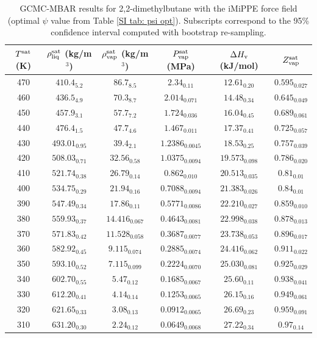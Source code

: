 \documentclass[journal=jctc,manuscript=article]{achemso}
\begin{document}
\begin{table}[htb!]
	\caption{GCMC-MBAR results for 2,2-dimethylbutane with the iMiPPE force field (optimal $\psi$ value from Table \ref{SI tab: psi opt}). Subscripts correspond to the 95\% confidence interval computed with bootstrap re-sampling.}
	\begin{center}
		\begin{tabular}{|c|c|c|c|c|c|}
			\hline
			$T^{\rm sat}$ (K) & $\rho_{\rm liq}^{\rm sat}$ (kg/m$^3$) & $\rho_{\rm vap}^{\rm sat}$ (kg/m$^3$) & $P_{\rm vap}^{\rm sat}$ (MPa) & $\Delta H_{\rm v}$ (kJ/mol) & $Z_{\rm vap}^{\rm sat}$ \\ \hline
			470 & $410.4_{5.2}$ & $86.7_{8.5}$ & $2.34_{0.11}$ & $12.61_{0.20}$ & $0.595_{0.027}$ \\
			460 & $436.5_{4.9}$ & $70.3_{8.7}$ & $2.014_{0.071}$ & $14.48_{0.34}$ & $0.645_{0.049}$ \\
			450 & $457.9_{3.1}$ & $57.7_{7.2}$ & $1.724_{0.036}$ & $16.04_{0.45}$ & $0.689_{0.061}$ \\
			440 & $476.4_{1.5}$ & $47.7_{4.6}$ & $1.467_{0.011}$ & $17.37_{0.41}$ & $0.725_{0.057}$ \\
			430 & $493.01_{0.95}$ & $39.4_{2.1}$ & $1.2386_{0.0045}$ & $18.53_{0.25}$ & $0.757_{0.039}$ \\
			420 & $508.03_{0.71}$ & $32.56_{0.58}$ & $1.0375_{0.0094}$ & $19.573_{0.098}$ & $0.786_{0.020}$ \\
			410 & $521.74_{0.38}$ & $26.79_{0.14}$ & $0.862_{0.010}$ & $20.513_{0.035}$ & $0.81_{0.01}$ \\
			400 & $534.75_{0.29}$ & $21.94_{0.16}$ & $0.7088_{0.0094}$ & $21.383_{0.026}$ & $0.84_{0.01}$ \\
			390 & $547.49_{0.34}$ & $17.86_{0.11}$ & $0.5771_{0.0086}$ & $22.210_{0.027}$ & $0.859_{0.010}$ \\
			380 & $559.93_{0.37}$ & $14.416_{0.067}$ & $0.4643_{0.0081}$ & $22.998_{0.038}$ & $0.878_{0.013}$ \\
			370 & $571.83_{0.42}$ & $11.528_{0.058}$ & $0.3687_{0.0077}$ & $23.738_{0.053}$ & $0.896_{0.017}$ \\
			360 & $582.92_{0.45}$ & $9.115_{0.074}$ & $0.2885_{0.0074}$ & $24.416_{0.062}$ & $0.911_{0.022}$ \\
			350 & $593.10_{0.52}$ & $7.115_{0.099}$ & $0.2224_{0.0070}$ & $25.030_{0.081}$ & $0.925_{0.029}$ \\
			340 & $602.70_{0.55}$ & $5.47_{0.12}$ & $0.1685_{0.0067}$ & $25.60_{0.11}$ & $0.938_{0.041}$ \\
			330 & $612.20_{0.41}$ & $4.14_{0.14}$ & $0.1253_{0.0065}$ & $26.15_{0.16}$ & $0.949_{0.061}$ \\
			320 & $621.65_{0.33}$ & $3.08_{0.13}$ & $0.0912_{0.0065}$ & $26.69_{0.23}$ & $0.959_{0.091}$ \\
			310 & $631.20_{0.30}$ & $2.24_{0.12}$ & $0.0649_{0.0068}$ & $27.22_{0.34}$ & $0.97_{0.14}$ \\
			\hline
		\end{tabular}
	\end{center}
\end{table}
\end{document}
